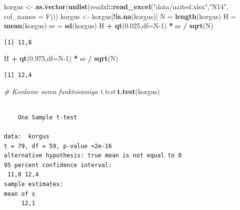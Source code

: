 \documentclass[
]{book}
\newenvironment{Shaded}{\begin{snugshade}}{\end{snugshade}}
\newcommand{\AttributeTok}[1]{\textcolor[rgb]{0.13,0.29,0.53}{#1}}
\newcommand{\CommentTok}[1]{\textcolor[rgb]{0.56,0.35,0.01}{\textit{#1}}}
\newcommand{\DecValTok}[1]{\textcolor[rgb]{0.00,0.00,0.81}{#1}}
\newcommand{\FloatTok}[1]{\textcolor[rgb]{0.00,0.00,0.81}{#1}}
\newcommand{\FunctionTok}[1]{\textcolor[rgb]{0.13,0.29,0.53}{\textbf{#1}}}
\newcommand{\NormalTok}[1]{#1}
\newcommand{\OtherTok}[1]{\textcolor[rgb]{0.56,0.35,0.01}{#1}}
\newcommand{\SpecialCharTok}[1]{\textcolor[rgb]{0.81,0.36,0.00}{\textbf{#1}}}
\newcommand{\StringTok}[1]{\textcolor[rgb]{0.31,0.60,0.02}{#1}}
\renewenvironment{Shaded} {\begin{snugshade}\footnotesize} {\end{snugshade}}
\theoremstyle{definition}
\theoremstyle{definition}
\theoremstyle{definition}
\theoremstyle{definition}
\theoremstyle{remark}
\begin{document}
\begin{Shaded}
\begin{Highlighting}[]
\NormalTok{korgus }\OtherTok{\textless{}{-}} \FunctionTok{as.vector}\NormalTok{(}\FunctionTok{unlist}\NormalTok{(readxl}\SpecialCharTok{::}\FunctionTok{read\_excel}\NormalTok{(}\StringTok{"data/naited.xlsx"}\NormalTok{,}\StringTok{"N14"}\NormalTok{, }\AttributeTok{col\_names =}\NormalTok{ F)))}
\NormalTok{korgus }\OtherTok{\textless{}{-}}\NormalTok{ korgus[}\SpecialCharTok{!}\FunctionTok{is.na}\NormalTok{(korgus)]}
\NormalTok{N }\OtherTok{=} \FunctionTok{length}\NormalTok{(korgus)}
\NormalTok{H }\OtherTok{=} \FunctionTok{mean}\NormalTok{(korgus)}
\NormalTok{se }\OtherTok{=} \FunctionTok{sd}\NormalTok{(korgus)}
\NormalTok{H }\SpecialCharTok{+} \FunctionTok{qt}\NormalTok{(}\FloatTok{0.025}\NormalTok{,}\AttributeTok{df=}\NormalTok{N}\DecValTok{{-}1}\NormalTok{) }\SpecialCharTok{*}\NormalTok{ se }\SpecialCharTok{/} \FunctionTok{sqrt}\NormalTok{(N)}
\end{Highlighting}
\end{Shaded}

\begin{verbatim}
[1] 11,8
\end{verbatim}

\begin{Shaded}
\begin{Highlighting}[]
\NormalTok{H }\SpecialCharTok{+} \FunctionTok{qt}\NormalTok{(}\FloatTok{0.975}\NormalTok{,}\AttributeTok{df=}\NormalTok{N}\DecValTok{{-}1}\NormalTok{) }\SpecialCharTok{*}\NormalTok{ se }\SpecialCharTok{/} \FunctionTok{sqrt}\NormalTok{(N)}
\end{Highlighting}
\end{Shaded}

\begin{verbatim}
[1] 12,4
\end{verbatim}

\begin{Shaded}
\begin{Highlighting}[]
\CommentTok{\# Kordame sama funktsiooniga t.test}
\FunctionTok{t.test}\NormalTok{(korgus)}
\end{Highlighting}
\end{Shaded}

\begin{verbatim}

    One Sample t-test

data:  korgus
t = 79, df = 59, p-value <2e-16
alternative hypothesis: true mean is not equal to 0
95 percent confidence interval:
 11,8 12,4
sample estimates:
mean of x 
     12,1 
\end{verbatim}
\end{document}
